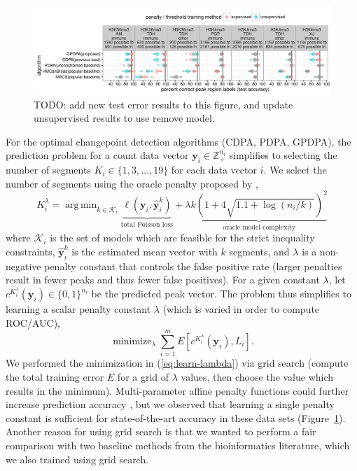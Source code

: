 \documentclass[twoside,11pt]{article}
\DeclareMathOperator*{\argmin}{arg\,min}
\DeclareMathOperator*{\minimize}{minimize}
\newcommand{\ZZ}{\mathbb Z}
\begin{document}
\begin{figure}[t!]
  \centering 
  \includegraphics[width=\textwidth]{figure-test-error-dots-supp}
  \vskip -0.5cm
  \caption{ TODO: add new test error results to this figure, and
    update unsupervised results to use remove model. }
  \label{fig:test-error-dots}
\end{figure}

For the optimal changepoint detection algorithms (CDPA, PDPA, GPDPA),
the prediction problem for a count data vector
$\mathbf y_i\in\ZZ_+^{n_i}$ simplifies to selecting the number of
segments $K_i\in \{1, 3,\dots, 19\}$ for each data vector $i$.
We select the number of segments
using the oracle penalty proposed by \citet{cleynen2013segmentation},
\begin{equation}
  K_i^\lambda=\argmin_{k\in \mathcal K_i} \underbrace{\ell(\mathbf y_i, \mathbf{\hat y}^k_i)}_{\text{total Poisson loss}} 
+ \lambda 
\underbrace{
k\left(
1 + 4\sqrt{1.1 + \log( n_i/k)}
\right)^2
}_{\text{
oracle model complexity
}}
\end{equation}
where $\mathcal K_i$ is the set of models which are feasible for the
strict inequality constraints, $\mathbf{\hat y}^k_i$ is the estimated
mean vector with $k$ segments, and $\lambda$ is a non-negative penalty
constant that controls the false positive rate (larger penalties
result in fewer peaks and thus fewer false positives). For a given
constant $\lambda$, let $c^{K_i^\lambda}(\mathbf y_i)\in\{0,1\}^{n_i}$
be the predicted peak vector. The problem thus simplifies to learning
a scalar penalty constant $\lambda$ (which is varied in order to
compute ROC/AUC),
\begin{equation}
  \label{eq:learn-lambda}
  \minimize_{\lambda}
  \sum_{i=1}^m E\left[
    c^{K_i^\lambda}(\mathbf y_i), 
    L_i\right].
\end{equation}
We performed the minimization in
(\ref{eq:learn-lambda}) via grid search (compute the total training error $E$
for a grid of $\lambda$ values, then choose the value which results in
the minimum). Multi-parameter affine penalty functions could further
increase prediction accuracy \citep{HOCKING-penalties}, but we
observed that learning a single penalty constant is sufficient for
state-of-the-art accuracy in these data sets
(Figure~\ref{fig:test-error-dots}). Another reason for using grid
search is that we wanted to perform a fair comparison with two
baseline methods from the bioinformatics literature, which we also
trained using grid search.
\end{document}
